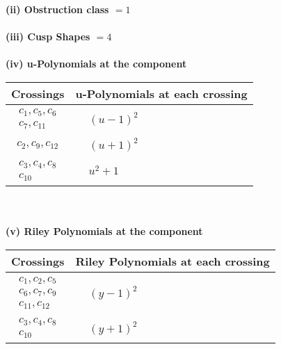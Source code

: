 \documentclass[1p]{elsarticle_modified}
\theoremstyle{definition}
\begin{document}
\flushleft \textbf{(ii) Obstruction class $= 1$}\\~\\
\flushleft \textbf{(iii) Cusp Shapes $= 4$}\\~\\
\newpage\renewcommand{\arraystretch}{1}
\flushleft \textbf{(iv) u-Polynomials at the component}\newline \\
\begin{tabular}{m{50pt}|m{274pt}}
Crossings & \hspace{64pt}u-Polynomials at each crossing \\
\hline $$\begin{aligned}c_{1},c_{5},c_{6}\\c_{7},c_{11}\end{aligned}$$&$\begin{aligned}
&(u-1)^2
\end{aligned}$\\
\hline $$\begin{aligned}c_{2},c_{9},c_{12}\end{aligned}$$&$\begin{aligned}
&(u+1)^2
\end{aligned}$\\
\hline $$\begin{aligned}c_{3},c_{4},c_{8}\\c_{10}\end{aligned}$$&$\begin{aligned}
&u^2+1
\end{aligned}$\\
\hline
\end{tabular}\\~\\
\newpage\renewcommand{\arraystretch}{1}
\flushleft \textbf{(v) Riley Polynomials at the component}\newline \\
\begin{tabular}{m{50pt}|m{274pt}}
Crossings & \hspace{64pt}Riley Polynomials at each crossing \\
\hline $$\begin{aligned}c_{1},c_{2},c_{5}\\c_{6},c_{7},c_{9}\\c_{11},c_{12}\end{aligned}$$&$\begin{aligned}
&(y-1)^2
\end{aligned}$\\
\hline $$\begin{aligned}c_{3},c_{4},c_{8}\\c_{10}\end{aligned}$$&$\begin{aligned}
&(y+1)^2
\end{aligned}$\\
\hline
\end{tabular}\\~\\
\end{document}
